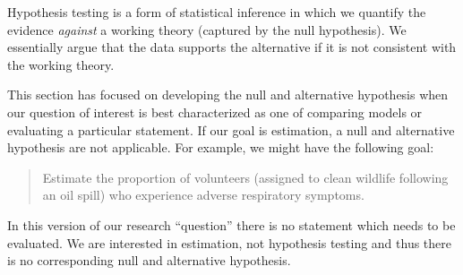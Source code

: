 \documentclass[
  letterpaper,
  DIV=11,
  numbers=noendperiod]{scrreprt}
\theoremstyle{definition}
\theoremstyle{definition}
\theoremstyle{plain}
\theoremstyle{remark}
\begin{document}
\begin{tcolorbox}[enhanced jigsaw, colbacktitle=quarto-callout-tip-color!10!white, colback=white, left=2mm, title=\textcolor{quarto-callout-tip-color}{\faLightbulb}\hspace{0.5em}{Big Idea}, toptitle=1mm, leftrule=.75mm, breakable, bottomrule=.15mm, arc=.35mm, rightrule=.15mm, toprule=.15mm, coltitle=black, opacityback=0, colframe=quarto-callout-tip-color-frame, opacitybacktitle=0.6, bottomtitle=1mm, titlerule=0mm]

Hypothesis testing is a form of statistical inference in which we
quantify the evidence \emph{against} a working theory (captured by the
null hypothesis). We essentially argue that the data supports the
alternative if it is not consistent with the working theory.

\end{tcolorbox}

This section has focused on developing the null and alternative
hypothesis when our question of interest is best characterized as one of
comparing models or evaluating a particular statement. If our goal is
estimation, a null and alternative hypothesis are not applicable. For
example, we might have the following goal:

\begin{quote}
Estimate the proportion of volunteers (assigned to clean wildlife
following an oil spill) who experience adverse respiratory symptoms.
\end{quote}

In this version of our research ``question'' there is no statement which
needs to be evaluated. We are interested in estimation, not hypothesis
testing and thus there is no corresponding null and alternative
hypothesis.
\end{document}
